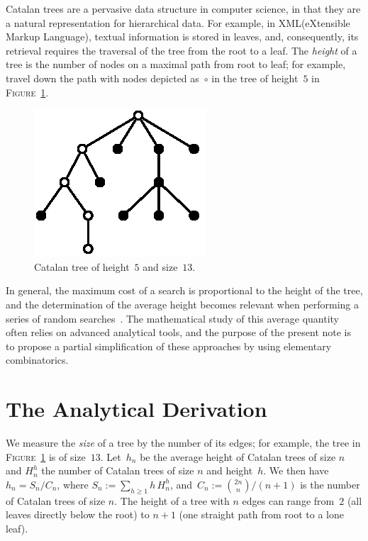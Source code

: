 \documentclass[11pt]{article}
\newcommand{\XML}{\textsf{XML}\xspace}
\newcommand\fig{\textsc{Figure}}
\begin{document}
Catalan trees are a pervasive data structure in computer science, in
that they are a natural representation for hierarchical data. For
example, in \XML (eXtensible Markup Language), textual information is stored
in leaves, and, consequently, its retrieval requires
the traversal of the tree from the root to a leaf. The \emph{height}
of a tree is the number of nodes on a maximal path from 
root to leaf; for example, travel down the path with nodes depicted
as~\(\circ\) in the tree of height~\(5\) in \fig~\ref{fig:catalan}.
\begin{figure}
\centering
\includegraphics{catalan}
\caption{Catalan tree of height~\(5\) and size~\(13\).\label{fig:catalan}}
\end{figure}

In general, the maximum cost of a search is proportional to the height
of the tree, and the determination of the average height becomes
relevant when performing a series of random
searches~\cite{VitterFlajolet:1990}. The mathematical study of this
average quantity often relies on advanced analytical tools, and the
purpose of the present note is to propose a partial simplification of
these approaches by using elementary combinatorics.

\section*{The Analytical Derivation}

We measure the \emph{size} of a tree by the number of its edges; for
example, the tree in \fig~\ref{fig:catalan} is of size~\(13\).
Let~\(h_n\) be the average height of Catalan trees of size \(n\) and
\(H_{n}^{h}\) the number of Catalan trees of size \(n\) and
height~\(h\). We then have \(h_n = S_n/C_{n}\), where \(S_n := \sum_{h
  \geqslant 1} h \, H_{n}^{h}\), and~\(C_n := \binom{2n}{n}/(n+1)\) is
the number of Catalan trees of size \(n\).  The height of a tree with
$n$ edges can range from~$2$ (all leaves directly below the root) to
$n+1$ (one straight path from root to a lone leaf).
\end{document}
